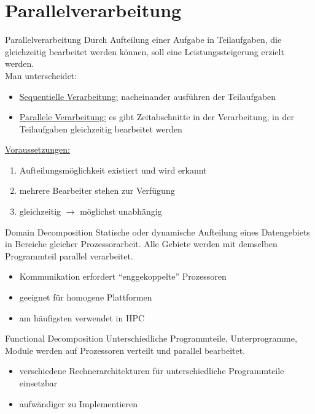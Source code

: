 \section{Parallelverarbeitung}\label{sec:parallelverarbeitung}

\begin{defi}{Parallelverarbeitung}
    Durch Aufteilung einer Aufgabe in Teilaufgaben,
    die gleichzeitig bearbeitet werden können,
    soll eine Leistungssteigerung erzielt werden.\\
    Man unterscheidet:
    \begin{itemize}
        \item \underline{Sequentielle Verarbeitung:} nacheinander ausführen der Teilaufgaben
        \item \underline{Parallele Verarbeitung:} es gibt Zeitabschnitte in der Verarbeitung, in der Teilaufgaben gleichzeitig bearbeitet werden
    \end{itemize}
    \underline{Voraussetzungen:}
    \begin{enumerate}
        \item Aufteilungsmöglichkeit existiert und wird erkannt
        \item mehrere Bearbeiter stehen zur Verfügung
        \item gleichzeitig $\to$ möglichst unabhängig
    \end{enumerate}
\end{defi}

\begin{defi}[Parallelverarbeitung]{Domain Decomposition}
    Statische oder dynamische Aufteilung eines Datengebiets in Bereiche gleicher Prozessorarbeit.
    Alle Gebiete werden mit demselben Programmteil parallel verarbeitet.
    \begin{itemize}[$\to$]
        \item Kommunikation erfordert \enquote{enggekoppelte} Prozessoren
        \item geeignet für homogene Plattformen
        \item am häufigsten verwendet in HPC
    \end{itemize}
\end{defi}

\begin{defi}[Parallelverarbeitung]{Functional Decomposition}
    Unterschiedliche Programmteile, Unterprogramme,
    Module werden auf Prozessoren verteilt und parallel bearbeitet.
    \begin{itemize}[$\to$]
        \item verschiedene Rechnerarchitekturen für unterschiedliche Programmteile einsetzbar
        \item aufwändiger zu Implementieren
    \end{itemize}
\end{defi}

